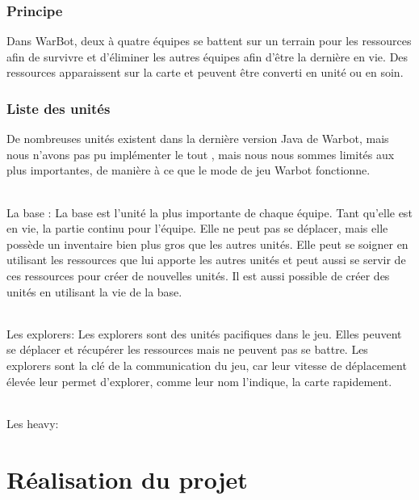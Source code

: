 \documentclass{report}
\begin{document}
\section{Principe}
Dans WarBot, deux à quatre équipes se battent sur un terrain pour les ressources afin de survivre et d'éliminer les autres équipes afin d’être la dernière en vie. Des ressources apparaissent sur la carte et peuvent être converti en unité ou en soin.

\section{Liste des unités}
De nombreuses unités existent dans la dernière version Java de Warbot, mais nous n’avons pas pu implémenter le tout , mais nous nous sommes limités aux plus importantes, de manière à ce que le mode de jeu Warbot fonctionne.
\paragraph{}
La base :\newline
La base est l’unité la plus importante de chaque équipe. Tant qu’elle est en vie, la partie continu pour l’équipe. \newline
Elle ne peut pas se déplacer, mais elle possède un inventaire bien plus gros que les autres unités. Elle peut se soigner en utilisant les ressources que lui apporte les autres unités et peut aussi se servir de ces ressources pour créer de nouvelles unités. Il est aussi possible de créer des unités en utilisant la vie de la base.
\paragraph{}
Les explorers:\newline
Les explorers sont des unités pacifiques dans le jeu. Elles peuvent se déplacer et récupérer les ressources mais ne peuvent pas se battre.\newline
Les explorers sont la clé de la communication du jeu, car leur vitesse de déplacement élevée leur permet d’explorer, comme leur nom l’indique, la carte rapidement.
\paragraph{}
Les heavy:\newline
\newpage
\part{Réalisation du projet}
\newpage
\end{document}
